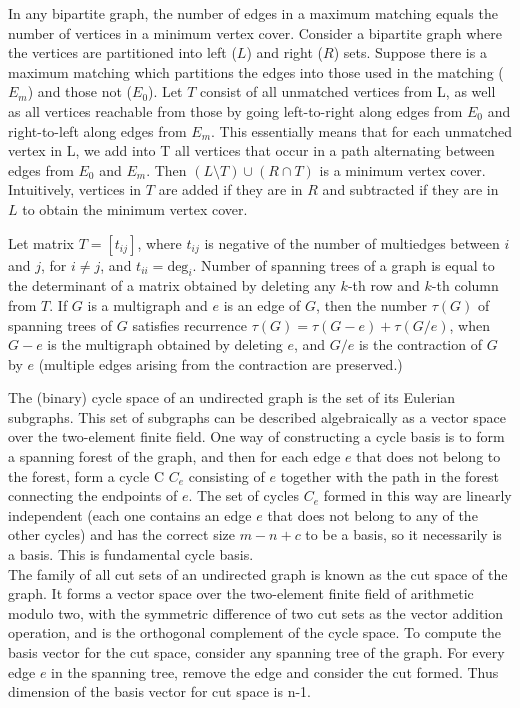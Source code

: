  In any bipartite graph, the number of edges in a maximum matching equals the number of vertices in a minimum vertex cover.
Consider a bipartite graph where the vertices are partitioned into left ($L$) and right ($R$) sets. Suppose there is a maximum matching which partitions the edges into those used in the matching ($E_m$) and those not ($E_0$). Let $T$ consist of all unmatched vertices from L, as well as all vertices reachable from those by going left-to-right along edges from $E_0$ and right-to-left along edges from $E_m$. This essentially means that for each unmatched vertex in L, we add into T all vertices that occur in a path alternating between edges from $E_0$ and $E_m$.
Then $(L \setminus T) \cup (R \cap T)$ is a minimum vertex cover. Intuitively, vertices in $T$ are added if they are in $R$ and subtracted if they are in $L$ to obtain the minimum vertex cover.
 
 Let matrix $T = [t_{ij}]$, where $t_{ij}$ is negative of the number of
multiedges between $i$ and $j$, for $i \ne j$, and $t_{ii} = \mbox{deg}_i$.
Number of spanning trees of a graph is equal to the determinant of
a matrix obtained by deleting any $k$-th row and $k$-th column from $T$.
If $G$ is a multigraph and $e$ is an edge of $G$, then the number $\tau(G)$ of
spanning trees of $G$ satisfies recurrence $\tau(G) = \tau(G-e) + \tau(G/e)$,
when $G-e$ is the multigraph obtained by deleting $e$, and $G/e$ is
the contraction of $G$ by $e$ (multiple edges arising from the contraction
are preserved.)

 The (binary) cycle space of an undirected graph is the set of its Eulerian subgraphs.
This set of subgraphs can be described algebraically as a vector space over the two-element finite field.
One way of constructing a cycle basis is to form a spanning forest of the graph, and then for each edge $e$ that does not belong to the forest, form a cycle C  $C_{e}$ consisting of $e$ together with the path in the forest connecting the endpoints of $e$. The set of cycles $C_{e}$ formed in this way are linearly independent (each one contains an edge $e$ that does not belong to any of the other cycles) and has the correct size $m − n + c$ to be a basis, so it necessarily is a basis. This is fundamental cycle basis.\\
 The family of all cut sets of an undirected graph is known as the cut space of the graph. It forms a vector space over the two-element finite field of arithmetic modulo two, with the symmetric difference of two cut sets as the vector addition operation, and is the orthogonal complement of the cycle space.      
To compute the basis vector for the cut space, consider any spanning tree of the graph. For every edge $e$ in the spanning tree, remove the edge and consider the cut formed. Thus dimension of the basis vector for cut space is n-1. \\  

